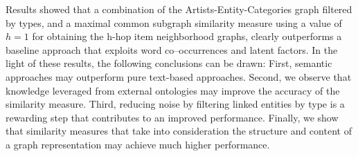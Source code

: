 Results showed that a combination of the Artists-Entity-Categories graph filtered by types, and a maximal common subgraph similarity measure using a value of $h=1$ for obtaining the h-hop item neighborhood graphs, clearly outperforms a baseline approach that exploits word co--occurrences and latent factors. In the light of these results, the following conclusions can be drawn: First, semantic approaches may outperform pure text-based approaches. Second, we observe that knowledge leveraged from external ontologies may improve the accuracy of the similarity measure. Third, reducing noise by filtering linked entities by type is a rewarding step that contributes to an improved performance. Finally, we show that similarity measures that take into consideration the structure and content of a graph representation may achieve much higher performance.

